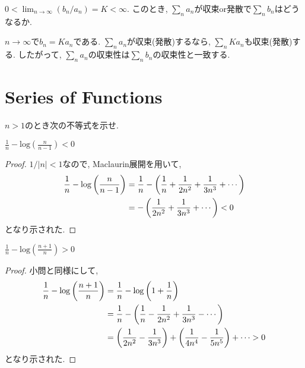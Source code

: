 \begin{qparts}
    \qpart $\displaystyle 0<\lim_{n\to\infty}(b_n/a_n)=K<\infty$. このとき, $\displaystyle\sum_na_n$が収束or発散で$\displaystyle\sum_nb_n$はどうなるか. 

    $n\to\infty$で$b_n=Ka_n$である. $\displaystyle\sum_na_n$が収束(発散)するなら, $\displaystyle\sum_nKa_n$も収束(発散)する. したがって, $\displaystyle\sum_na_n$の収束性は$\displaystyle\sum_nb_n$の収束性と一致する. 
\end{qparts}

\section{Series of Functions} %
\label{sec:Series of Functions}
\begin{qparts}
    \qpart
    \qpart
    \qpart
    \qpart
    \qpart
    \qpart
    \qpart
    \qpart
    \qpart
    \qpart
    \qpart
    \qpart

    \qpart $n>1$のとき次の不等式を示せ. 
        \begin{qlist}
            \qitem $\displaystyle\frac{1}{n}-\mathrm{log}\left(\frac{n}{n-1}\right)<0$ \label{q:1.2.13a}
            \begin{proof}
                $1/|n|<1$なので, Maclaurin展開を用いて, 
                \begin{align}
                    \frac{1}{n}-\mathrm{log}\left(\frac{n}{n-1}\right) &= \frac{1}{n}-\left(\frac{1}{n}+\frac{1}{2n^2}+\frac{1}{3n^3}+\cdots\right) \notag \\
                    &= -\left(\frac{1}{2n^2}+\frac{1}{3n^3}+\cdots\right) < 0 \notag
                \end{align}
                となり示された. 
            \end{proof}

            \qitem $\displaystyle\frac{1}{n}-\mathrm{log}\left(\frac{n+1}{n}\right)>0$ \label{q:1.2.13b}
            \begin{proof}
                小問と同様にして, 
                \begin{align}
                    \frac{1}{n}-\mathrm{log}\left(\frac{n+1}{n}\right) &= \frac{1}{n}-\mathrm{log}\left(1+\frac{1}{n}\right) \notag \\
                    &= \frac{1}{n}-\left(\frac{1}{n}-\frac{1}{2n^2}+\frac{1}{3n^3}-\cdots\right) \notag \\
                    &= \left(\frac{1}{2n^2}-\frac{1}{3n^3}\right)+\left(\frac{1}{4n^4}-\frac{1}{5n^5}\right)+\cdots > 0 \notag
                \end{align}
                となり示された. 
            \end{proof}


\end{qlist}
\end{qparts}
